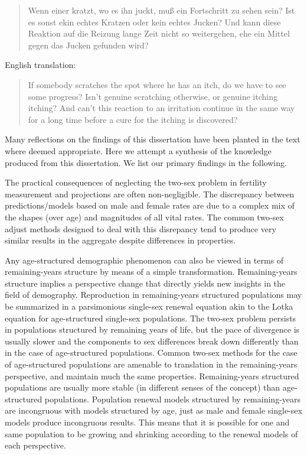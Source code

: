 \FloatBarrier
\label{sec:reflections}

\begin{singlespace}
\begin{quote}
Wenn einer kratzt, wo es ihn juckt, mu{\ss} ein Fortschritt zu sehen sein? Ist
es sonst ekin echtes Kratzen oder kein echtes Jucken? Und kann diese Reaktion
auf die Reizung lange Zeit nicht so weitergehen, ehe ein Mittel gegen das Jucken
gefunden wird?
\citep{wittgenstein1984culture}
\end{quote}

English translation:
\begin{quote}
 If somebody scratches the spot where he has an itch, do we have to see 
 some progress? Isn't genuine scratching otherwise, or genuine itching 
itching? And can't this reaction to an irritation continue in the 
same way for a long time before a cure for the itching is discovered?
\citep{wittgenstein1984culture}
\end{quote}
\end{singlespace}

Many reflections on the findings of this dissertation have been planted in the
text where deemed appropriate. Here we attempt a synthesis of the
knowledge produced from this dissertation. We list our primary findings in the
following.

The practical consequences of neglecting the two-sex problem in fertility
measurement and projections are often non-negligible. The discrepancy between 
predictions/models based on male and female rates are
due to a complex mix of the shapes (over age) and magnitudes of all vital rates. 
The common two-sex adjust methods designed to deal with this disrepancy tend to
produce very similar results in the aggregate despite differences in properties. 

Any age-structured demographic phenomenon can also be
viewed in terms of remaining-years structure by means of a simple 
transformation. Remaining-years structure implies a perspective
change that directly yields new insights in the field of demography.
Reproduction in remaining-years structured populations may be summarized in a
parsimonious single-sex renewal equation akin to the Lotka equation
for age-structured single-sex populations. The two-sex problem
persists in populations structured by remaining years of life, but the pace of
divergence is usually slower and the components to sex differences break down
differently than in the case of age-structured populations. Common two-sex
methods for the case of age-structured populations are amenable to translation
in the remaining-years perspective, and maintain much the same properties.
Remaining-years structured populations are usually more stable (in different
senses of the concept) than age-structured populations. Population renewal models structured
by remaining-years are incongruous with models structured by age, just as male and 
female single-sex models produce incongruous results. This means that it is
possible for one and same population to be growing and shrinking according to
the renewal models of each perspective.



